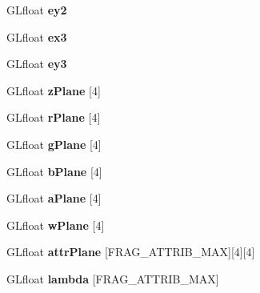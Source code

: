 \begin{DoxyCompactItemize}
\item 
\mbox{\label{struct_line_info_aaebbd38dcaab8c8791ccecafdd4d8a97}} 
G\+Lfloat {\bfseries ey2}
\item 
\mbox{\label{struct_line_info_a6275f9fc5cef65167f1d7c65833cd072}} 
G\+Lfloat {\bfseries ex3}
\item 
\mbox{\label{struct_line_info_ae21f33d3b1fee11e451d2fb1bb9e3a0b}} 
G\+Lfloat {\bfseries ey3}
\item 
\mbox{\label{struct_line_info_ab8ea52b58e8e3b7317d42d486a9fcaca}} 
G\+Lfloat {\bfseries z\+Plane} \mbox{[}4\mbox{]}
\item 
\mbox{\label{struct_line_info_add34bf48ed11a1f43742a21d3e143fd9}} 
G\+Lfloat {\bfseries r\+Plane} \mbox{[}4\mbox{]}
\item 
\mbox{\label{struct_line_info_acb58e81023fa83af875e58de84fb7a68}} 
G\+Lfloat {\bfseries g\+Plane} \mbox{[}4\mbox{]}
\item 
\mbox{\label{struct_line_info_aff15449bf8a618c63e0de75159fc7b4e}} 
G\+Lfloat {\bfseries b\+Plane} \mbox{[}4\mbox{]}
\item 
\mbox{\label{struct_line_info_a521839c0d088059bb8bb9c4c82bc3862}} 
G\+Lfloat {\bfseries a\+Plane} \mbox{[}4\mbox{]}
\item 
\mbox{\label{struct_line_info_aea5b41e52c7557878e8138133fc64335}} 
G\+Lfloat {\bfseries w\+Plane} \mbox{[}4\mbox{]}
\item 
\mbox{\label{struct_line_info_a07b7c70711dcae189fcf92d07f0fd64b}} 
G\+Lfloat {\bfseries attr\+Plane} \mbox{[}F\+R\+A\+G\+\_\+\+A\+T\+T\+R\+I\+B\+\_\+\+M\+AX\mbox{]}\mbox{[}4\mbox{]}\mbox{[}4\mbox{]}
\item 
\mbox{\label{struct_line_info_afdd9071548264be6ed59f586681b1683}} 
G\+Lfloat {\bfseries lambda} \mbox{[}F\+R\+A\+G\+\_\+\+A\+T\+T\+R\+I\+B\+\_\+\+M\+AX\mbox{]}
\item 

\end{DoxyCompactItemize}
